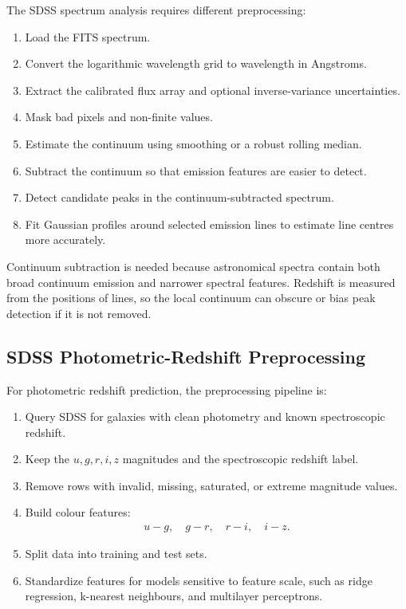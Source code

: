 \documentclass[11pt,a4paper]{article}
\begin{document}
The SDSS spectrum analysis requires different preprocessing:

\begin{enumerate}
    \item Load the FITS spectrum.
    \item Convert the logarithmic wavelength grid to wavelength in Angstroms.
    \item Extract the calibrated flux array and optional inverse-variance uncertainties.
    \item Mask bad pixels and non-finite values.
    \item Estimate the continuum using smoothing or a robust rolling median.
    \item Subtract the continuum so that emission features are easier to detect.
    \item Detect candidate peaks in the continuum-subtracted spectrum.
    \item Fit Gaussian profiles around selected emission lines to estimate line centres more accurately.
\end{enumerate}

Continuum subtraction is needed because astronomical spectra contain both broad continuum emission and narrower spectral features. Redshift is measured from the positions of lines, so the local continuum can obscure or bias peak detection if it is not removed.

\subsection{SDSS Photometric-Redshift Preprocessing}

For photometric redshift prediction, the preprocessing pipeline is:

\begin{enumerate}
    \item Query SDSS for galaxies with clean photometry and known spectroscopic redshift.
    \item Keep the $u,g,r,i,z$ magnitudes and the spectroscopic redshift label.
    \item Remove rows with invalid, missing, saturated, or extreme magnitude values.
    \item Build colour features:
    \begin{align}
        u-g, \quad g-r, \quad r-i, \quad i-z.
    \end{align}
    \item Split data into training and test sets.
    \item Standardize features for models sensitive to feature scale, such as ridge regression, k-nearest neighbours, and multilayer perceptrons.
\end{enumerate}
\end{document}
